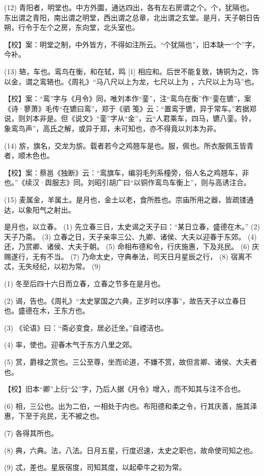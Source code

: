 \documentclass[12pt,UTF8]{ctexbook}
\begin{document}
(12) 青阳者，明堂也。中方外圜，通达四出，各有左右房谓之个。个，犹隔也。东出谓之青阳，南出谓之明堂，西出谓之总章，北出谓之玄堂。是月，天子朝日告朔，行令于左个之房，东向堂，北头室也。

【校】案：明堂之制，中外皆方，不得如注所云。“个犹隔也”，旧本缺一“个”字，今补。

(13) 辂，车也。鸾鸟在衡，和在轼，鸣 [1] 相应和。后世不能复致，铸铜为之，饰以金，谓之鸾辂也。《周礼》“马八尺以上为龙，七尺以上为 ，六尺以上为马”也。

【校】案：“鸾”字与《月令》同，唯刘本作“銮”，注“鸾鸟在衡”作“銮在镳”，案《诗·蓼萧》毛传“在镳曰鸾”，郑于《驷 笺》云：“置鸾于镳，异于常车。”若据郑说，则刘本非是。但《说文》“銮”字从“金”，云“人君乘车，四马，镳八銮。铃，象鸾鸟声”，高氏之解，或异于郑，未可知也，亦不得竟以刘本为非。

(14) 旂，旗名，交龙为旂。载者若今之鸡翘车是也。服，佩也。所衣服佩玉皆青者，顺木色也。

【校】案：蔡邕《独断》云：“鸾旗车，编羽毛列系橦旁，俗人名之鸡翘车，非也。”《续汉·舆服志》同。刘昭引胡广曰“以铜作鸾鸟车衡上”，则与高诱注合。

(15) 麦属金，羊属土。是月也，金土以老，食所胜也。宗庙所用之器，皆疏镂通达，以象阳气之射出。

是月也，以立春。 (1) 先立春三日，太史谒之天子曰：“某日立春，盛德在木。” (2) 天子乃斋。 (3) 立春之日，天子亲率三公、九卿、诸侯、大夫以迎春于东郊。 (4) 还，乃赏卿、诸侯、大夫于朝。 (5) 命相布德和令，行庆施惠，下及兆民。 (6) 庆赐遂行，无有不当。 (7) 乃命太史，守典奉法，司天日月星辰之行， (8) 宿离不忒，无失经纪，以初为常。 (9)

(1) 冬至后四十六日而立春，立春之节多在是月也。

(2) 谒，告也。《周礼》“太史掌国之六典，正岁时以序事”，故告天子以立春日也。盛德在木，王东方也。

(3) 《论语》曰：“斋必变食，居必迁坐。”自禋洁也。

(4) 率，使也。迎春木气于东方八里之郊。

(5) 赏，爵禄之赏也。三公至尊，坐而论道，不嫌不赏，故但言卿、诸侯、大夫者也。

【校】旧本“卿”上衍“公”字，乃后人据《月令》增入，而不知其与注不合也。

(6) 相，三公也。出为二伯，一相处于内也。布阳德和柔之令，行其庆善，施其泽惠，下至于兆民，无不被之也。

(7) 各得其所也。

(8) 典，六典。法，八法。日月五星，行度迟速，太史之职也，故命使司知之也。

(9) 忒，差也。星辰宿度，司知其度，以起牵牛之初为常。
\end{document}
